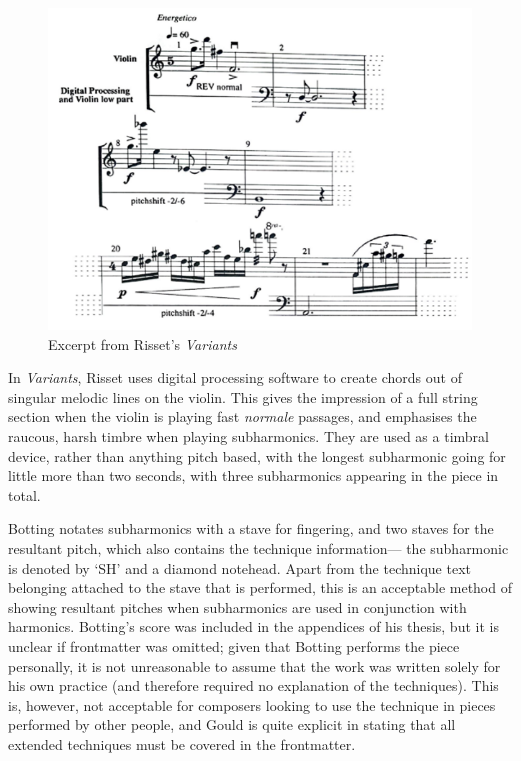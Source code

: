 \begin{figure}
  \includegraphics[]{./resources/rissetALFExcerpt.pdf}
  \caption{Excerpt from Risset's \emph{Variants}}\label{fig:Excerpt from Risset's Variants}\end{figure}

In \emph{Variants}, Risset uses digital processing software to create chords out of singular melodic lines on the violin.
This gives the impression of a full string section when the violin is playing fast \emph{normale} passages, and emphasises the raucous, harsh timbre when playing subharmonics.
They are used as a timbral device, rather than anything pitch based, with the longest subharmonic going for little more than two seconds, with three subharmonics appearing in the piece in total.


Botting notates subharmonics with a stave for fingering, and two staves for the resultant pitch, which also contains the technique information--- the subharmonic is denoted by `SH' and a diamond notehead.\autocite[109]{bottingDevelopingPersonalVocabulary2019}
Apart from the technique text belonging attached to the stave that is performed, this is an acceptable method of showing resultant pitches when subharmonics are used in conjunction with harmonics.
Botting's score was included in the appendices of his thesis, but it is unclear if frontmatter was omitted; given that Botting performs the piece personally, it is not unreasonable to assume that the work was written solely for his own practice (and therefore required no explanation of the techniques).
This is, however, not acceptable for composers looking to use the technique in pieces performed by other people, and Gould is quite explicit in stating that all extended techniques must be covered in the frontmatter.\autocite[494]{gouldBars2011}

